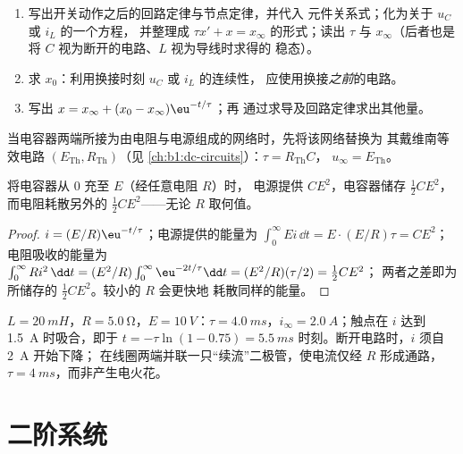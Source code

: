 \begin{method}[求解一阶暂态过程]\label{met:b1:transient-regimes:first}
\begin{enumerate}
  \item 写出开关动作之后的回路定律与节点定律，并代入
        元件关系式；化为关于 $u_C$ 或 $i_L$ 的一个方程，
        并整理成 $\tau x' + x = x_\infty$ 的形式；读出 $\tau$ 与
        $x_\infty$（后者也是将 $C$ 视为断开的电路、$L$ 视为导线时求得的
        稳态）。
  \item 求 $x_0$：利用换接时刻 $u_C$ 或 $i_L$ 的连续性，
        应使用换接\emph{之前}的电路。
  \item 写出 $x = x_\infty + (x_0 - x_\infty)\eu^{-t/\tau}$；再
        通过求导及回路定律求出其他量。
\end{enumerate}
当电容器两端所接为由电阻与电源组成的网络时，先将该网络替换为
其戴维南等效电路 $(E_{\mathrm{Th}}, R_{\mathrm{Th}})$（见
\cref{ch:b1:dc-circuits}）：$\tau = R_{\mathrm{Th}}C$，
$u_\infty = E_{\mathrm{Th}}$。
\end{method}

\begin{proposition}[RC 充电的能量平衡]\label{prop:b1:transient-regimes:rcenergy}
将电容器从 $0$ 充至 $E$（经任意电阻 $R$）时，
电源提供 $CE^2$，电容器储存 $\tfrac12 CE^2$，
而电阻耗散另外的 $\tfrac12 CE^2$——无论 $R$ 取何值。
\end{proposition}

\begin{proof}
$i = (E/R)\eu^{-t/\tau}$；电源提供的能量为 $\int_0^\infty Ei\,\dd t
= E \cdot (E/R)\tau = CE^2$；电阻吸收的能量为 $\int_0^\infty Ri^2\,\dd t
= (E^2/R)\int_0^\infty \eu^{-2t/\tau}\dd t = (E^2/R)(\tau/2) = \tfrac12 CE^2$；
两者之差即为所储存的 $\tfrac12 CE^2$。较小的 $R$ 会更快地
耗散同样的能量。
\end{proof}

\begin{example}[继电器线圈]\label{ex:b1:transient-regimes:relay}
$L = \qty{20}{mH}$，$R = \qty{5.0}{\ohm}$，$E = \qty{10}{V}$：$\tau =
\qty{4.0}{ms}$，$i_\infty = \qty{2.0}{A}$；触点在
$i$ 达到 \qty{1.5}{A} 时吸合，即于 $t = -\tau\ln(1 - 0.75) =
\qty{5.5}{ms}$ 时刻。断开电路时，$i$ 须自 \qty{2}{A} 开始下降；
在线圈两端并联一只“续流”二极管，使电流仅经 $R$
形成通路，$\tau = \qty{4}{ms}$，而非产生电火花。
\end{example}

\section{二阶系统}

